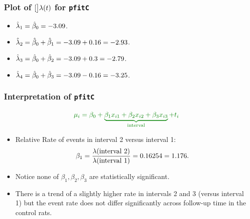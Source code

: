 \documentclass[oneside]{book}\usepackage[]{graphicx}\usepackage[svgnames]{xcolor}
\let\exp\relax%
\let\log\relax%
\begin{document}
\subsubsection*{Plot of $\log[\big]{\lambda(t)}$ for \texttt{pfitC}}
\begin{center}
\end{center}
\begin{itemize}
    \item $ \log{\hat{\lambda}_1}=\hat{\beta}_0=-3.09 $.
    \item $ \log{\hat{\lambda}_2}=\hat{\beta}_0+\hat{\beta}_1=-3.09+0.16=-2.93 $.
    \item $ \log{\hat{\lambda}_3}=\hat{\beta}_0+\hat{\beta}_2=-3.09+0.3=-2.79 $.
    \item $ \log{\hat{\lambda}_4}=\hat{\beta}_0+\hat{\beta}_3=-3.09-0.16=-3.25 $.
\end{itemize}
\subsubsection*{Interpretation of \texttt{pfitC}}
\[ \textcolor{Green}{\log{\mu_i}=\beta_0+\underbrace{\beta_1x_{i1}+\beta_2x_{i2}+\beta_3x_{i3}}_{\text{interval}}+\log{t_i}} \]
\begin{itemize}
    \item Relative Rate of events in interval 2 versus interval 1:
          \[ \exp{\beta_1}=\frac{\lambda(\text{interval 2})}{\lambda(\text{interval 1})}=\exp{0.16254}=1.176. \]
    \item Notice none of $ \beta_1,\beta_2,\beta_3 $ are statistically significant.
    \item There is a trend of a slightly higher rate in intervals 2 and 3 (versus interval 1) but
          the event rate does not differ significantly across follow-up time in the control rats.
\end{itemize}
\end{document}

